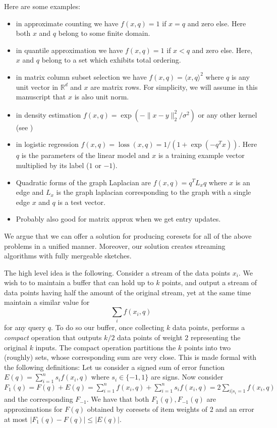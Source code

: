\documentclass{article} %
\newcommand{\R}{\mathbb{R}}
\begin{document}
Here are some examples:
\begin{itemize}
\item in approximate counting we have $f(x, q) = 1$ if $x=q$ and zero else. Here both $x$ and $q$ belong to some finite domain.
\item in quantile approximation we have $f(x, q) = 1$ if $x<q$ and zero else. Here, $x$ and $q$ belong to a set which exhibits total ordering.
\item in matrix column subset selection we have $f(x, q) = \langle x,q \rangle ^2$ where $q$ is any unit vector in $\R^d$ and $x$ are matrix rows. For simplicity, we will assume in this manuscript that $x$ is also unit norm.
\item in density estimation $f(x, q) = \exp(- \|x-y\|_2^2/\sigma^2)$ or any other kernel (see \cite{})
\item in logistic regression $f(x, q) = \operatorname{loss}(x,q) = 1/(1 + \exp(-q^T x))$. 
Here $q$ is the parameters of the linear model and $x$ is a training example vector multiplied by its label ($1$ or $-1$).
\item Quadratic forms of the graph Laplacian are $f(x, q) = q^T L_x q$ where $x$ is an edge and $L_x$ is the graph laplacian  corresponding to the graph with a single edge $x$ and $q$ is a test vector.
\item Probably also good for matrix approx when we get entry updates. 
\end{itemize}

We argue that we can offer a solution for producing coresets for all of the above problems in a unified manner. 
Moreover, our solution creates streaming algorithms with fully mergeable sketches. 

The high level idea is the following. Consider a stream of the data points $x_i$. We wish to to maintain a buffer that can hold up to $k$ points, and output a stream of data points having half the amount of the original stream, yet at the same time maintain a similar value for 
$$ \sum_i f(x_i, q) $$
for any query $q$. To do so our buffer, once collecting $k$ data points, performs a \emph{compact} operation that outputs $k/2$ data points of weight $2$ representing the original $k$ inputs. The compact operation partitions the $k$ points into two (roughly) sets, whose corresponding sum are very close. This is made formal with the following definitions: Let us consider a signed sum of error function $E(q) = \sum_{i=1}^{n} s_i f(x_i,q)$ where $s_i \in \{-1,1\}$ are signs.
Now consider $F_1(q) = F(q) + E(q) = \sum_{i=1}^{n} f(x_i,q)  + \sum_{i=1}^{n} s_i f(x_i,q)  = 2 \sum_{i | s_i=1} f(x_i,q)$ and the corresponding $F_{-1}$. We have that both $F_1(q), F_{-1}(q)$ are approximations for $F(q)$ obtained by coresets of item weights of $2$ and an error at most $|F_1(q) - F(q)| \le  | E(q)|$.
\end{document}
